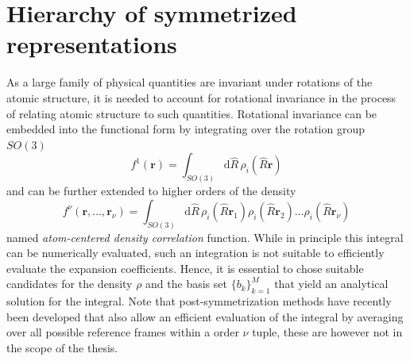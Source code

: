 \section{Hierarchy of symmetrized representations}
As a large family of physical quantities are invariant under rotations of the atomic structure, it is needed to account for rotational invariance in the process of relating atomic structure to such quantities.
Rotational invariance can be embedded into the functional form by integrating over the rotation group $SO(3)$
\begin{equation}
\label{eq:integration_over_subgroup}
  f^1(\mathbf{r}) = \int_{SO(3)}\mathrm{d}\hat{R}\, \rho_i(\hat{R}\mathbf{r})
\end{equation}
and can be further extended to higher orders of the density
\begin{equation}
\label{eq:integration_over_subgroup_higher_order}
  f^\nu(\mathbf{r},\ldots, \mathbf{r}_\nu) = \int_{SO(3)}\mathrm{d}\hat{R}\, \rho_i(\hat{R}\mathbf{r}_1)\rho_i(\hat{R}\mathbf{r}_2)\ldots\rho_i(\hat{R}\mathbf{r}_\nu)
\end{equation}
named \emph{atom-centered density correlation} function\cite{nigam2022unified}.
While in principle this integral can be numerically evaluated, such an integration is not suitable to efficiently evaluate the expansion coefficients.
Hence, it is essential to chose suitable candidates for the density $\rho$ and the basis set $\{b_k\}_{k=1}^M$ that yield an analytical solution for the integral.
Note that post-symmetrization methods have recently been developed that also allow an efficient evaluation of the integral by averaging over all possible reference frames within a order $\nu$ tuple\cite{pozdnyakov2023smooth}, these are however not in the scope of the thesis.

